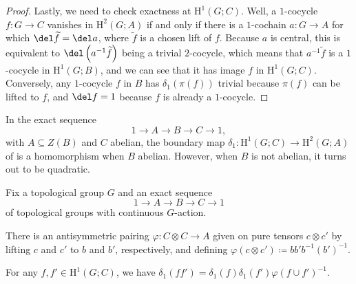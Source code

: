 \documentclass[notes.tex]{subfiles}
\begin{document}
\begin{proof}
	Lastly, we need to check exactness at $\mathrm H^1(G;C)$. Well,  a $1$-cocycle $f\colon G\to C$ vanishes in $\mathrm H^2(G;A)$ if and only if there is a $1$-cochain $a\colon G\to A$ for which $\del\widetilde f=\del a$, where $\widetilde f$ is a chosen lift of $f$. Because $a$ is central, this is equivalent to $\del\left(a^{-1}\widetilde f\right)$ being a trivial $2$-cocycle, which means that $a^{-1}\widetilde f$ is a $1$-cocycle in $\mathrm H^1(G;B)$, and we can see that it has image $f$ in $\mathrm H^1(G;C)$. Conversely, any $1$-cocycle $f$ in $B$ has $\delta_1(\pi(f))$ trivial because $\pi(f)$ can be lifted to $f$, and $\del f=1$ because $f$ is already a $1$-cocycle.
\end{proof}
In the exact sequence
\[1\to A\to B\to C\to1,\]
with $A\subseteq Z(B)$ and $C$ abelian, the boundary map $\delta_1\colon\mathrm H^1(G;C)\to\mathrm H^2(G;A)$ of  is a homomorphism when $B$ abelian. However, when $B$ is not abelian, it turns out to be quadratic.
\begin{proposition} \label{prop:commutator-gives-cup}
	Fix a topological group $G$ and an exact sequence
	\[1\to A\to B\to C\to1\]
	of topological groups with continuous $G$-action.
	\begin{listalph}
		\item There is an antisymmetric pairing $\varphi\colon C\otimes C\to A$ given on pure tensors $c\otimes c'$ by lifting $c$ and $c'$ to $b$ and $b'$, respectively, and defining $\varphi(c\otimes c')\coloneqq bb'b^{-1}(b')^{-1}$.
		\item For any $f,f'\in\mathrm H^1(G;C)$, we have $\delta_1(ff')=\delta_1(f)\delta_1(f')\varphi(f\cup f')^{-1}$.
	\end{listalph}
\end{proposition}
\end{document}
